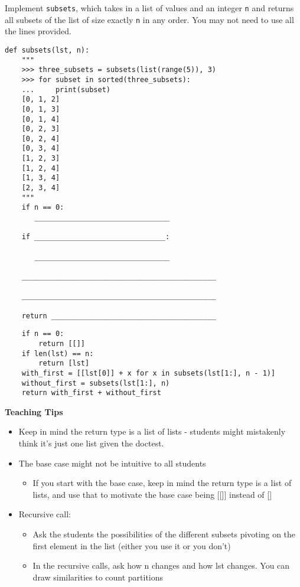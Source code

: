 \begin{blocksection}
\question Implement \lstinline$subsets$, which takes in a list of values and an
integer \lstinline$n$ and returns all subsets of the list of size exactly
\lstinline$n$ in any order. You may not need to use all the lines provided.

\begin{lstlisting}
def subsets(lst, n):
    """
    >>> three_subsets = subsets(list(range(5)), 3)
    >>> for subset in sorted(three_subsets):
    ...     print(subset)
    [0, 1, 2]
    [0, 1, 3]
    [0, 1, 4]
    [0, 2, 3]
    [0, 2, 4]
    [0, 3, 4]
    [1, 2, 3]
    [1, 2, 4]
    [1, 3, 4]
    [2, 3, 4]
    """
    if n == 0:
       ________________________________

    if _______________________________:

       ________________________________

    ______________________________________________

    ______________________________________________

    return _______________________________________

\end{lstlisting}
\end{blocksection}
\begin{blocksection}
\begin{solution}
\begin{lstlisting}
    if n == 0:
        return [[]]
    if len(lst) == n:
        return [lst]
    with_first = [[lst[0]] + x for x in subsets(lst[1:], n - 1)]
    without_first = subsets(lst[1:], n)
    return with_first + without_first
\end{lstlisting}
\end{solution}
\end{blocksection}

\begin{guide}
    \textbf{Teaching Tips}
    \begin{itemize}
       \item Keep in mind the return type is a list of lists - students might mistakenly think it’s just one list given the doctest.
       \item The base case might not be intuitive to all students 
       \begin{itemize}
           \item If you start with the base case, keep in mind the return type is a list of lists, and use that to motivate the base case being [[]] instead of []
       \end{itemize}
       \item Recursive call: 
       \begin{itemize}
           \item Ask the students the possibilities of the different subsets pivoting on the first element in the list (either you use it or you don’t)
           \item In the recursive calls, ask how n changes and how lst changes. You can draw similarities to count partitions
       \end{itemize}
    \end{itemize}
 \end{guide}
